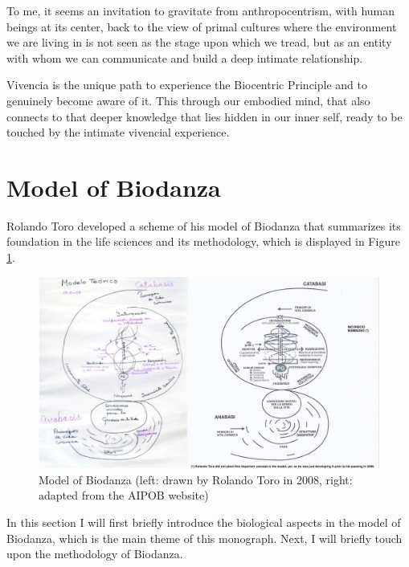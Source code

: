 \documentclass[
  11pt,
]{book}
\begin{document}
To me, it seems an invitation to gravitate from anthropocentrism, with human beings at its center, back to the view of primal cultures where the environment we are living in is not seen as the stage upon which we tread, but as an entity with whom we can communicate and build a deep intimate relationship.

Vivencia is the unique path to experience the Biocentric Principle and to genuinely become aware of it. This through our embodied mind, that also connects to that deeper knowledge that lies hidden in our inner self, ready to be touched by the intimate vivencial experience.

\hypertarget{sectionModelOfBiodanza}{%
\section{Model of Biodanza}\label{sectionModelOfBiodanza}}

Rolando Toro developed a scheme of his model of Biodanza that summarizes its foundation in the life sciences and its methodology, which is displayed in Figure \ref{fig:model}.

\begin{figure}

{\centering \includegraphics[width=1\linewidth]{./figs/biodanzamodel2andRolando} 

}

\caption{Model of Biodanza (left: drawn by Rolando Toro in 2008, right: adapted from the AIPOB website)}\label{fig:model}
\end{figure}

In this section I will first briefly introduce the biological aspects in the model of Biodanza, which is the main theme of this monograph. Next, I will briefly touch upon the methodology of Biodanza.
\end{document}

